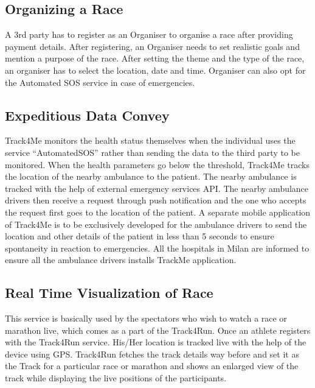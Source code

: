 \subsection{Organizing a Race}
\qquad A 3rd party has to register as an Organiser to organise a race after providing payment details. After registering, an Organiser needs to set realistic goals and mention a purpose of the race. After setting the theme and the type of the race, an organiser has to select the location, date and time. Organiser can also opt for the Automated SOS service in case of emergencies.

\subsection{Expeditious Data Convey}
\qquad Track4Me monitors the health status themselves when the individual uses the service “AutomatedSOS” rather than sending the data to the third party to be monitored. When the health parameters go below the threshold, Track4Me tracks the location of the nearby ambulance to the patient. The nearby ambulance is tracked with the help of external emergency services API. The nearby ambulance drivers then receive a request through push notification and the one who accepts the request first goes to the location of the patient. A separate mobile application of Track4Me is to be exclusively developed for the ambulance drivers to send the location and other details of the patient in less than 5 seconds to ensure spontaneity in reaction to emergencies. All the hospitals in Milan are informed to ensure all the ambulance drivers installs TrackMe application.

\subsection{Real Time Visualization of Race}
\qquad This service is basically used by the spectators who wish to watch a race or marathon live, which comes as a part of the Track4Run. Once an athlete registers with the Track4Run service. His/Her location is tracked live with the help of the device using GPS. Track4Run fetches the track details way before and set it as the Track for a particular race or marathon and shows an enlarged view of the track while displaying the live positions of the participants.